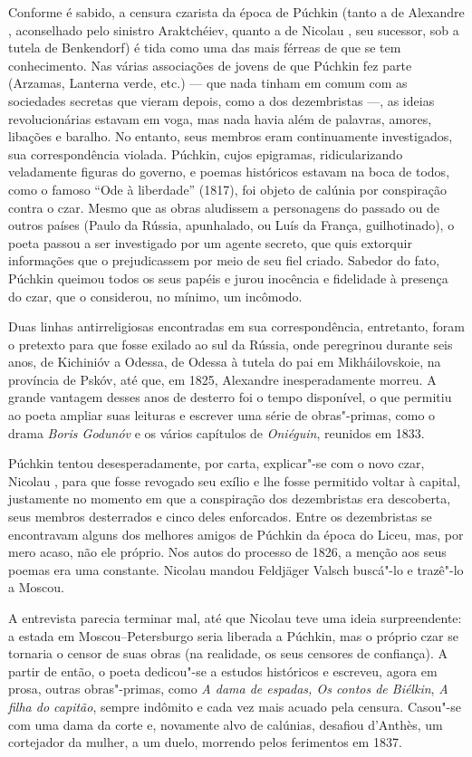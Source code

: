 Conforme é sabido, a censura czarista da época de Púchkin (tanto a de
Alexandre , aconselhado pelo sinistro Araktchéiev, quanto a de Nicolau , seu sucessor, sob a tutela de Benkendorf) é tida como uma das mais férreas de que se tem conhecimento. Nas várias associações de jovens de que Púchkin fez parte (Arzamas, Lanterna verde, etc.) --- que nada tinham em
comum com as sociedades secretas que vieram depois, como a dos dezembristas ---, as ideias revolucionárias estavam em voga, mas nada havia além de palavras, amores, libações e baralho. No entanto, seus membros eram continuamente investigados, sua correspondência violada. Púchkin, cujos epigramas, ridicularizando veladamente figuras do governo, e poemas históricos estavam na boca de todos, como o famoso ``Ode à liberdade'' (1817), foi objeto de calúnia por conspiração contra o czar. Mesmo que as obras aludissem a
personagens do passado ou de outros países (Paulo  da Rússia,
apunhalado, ou Luís  da França, guilhotinado), o poeta passou a ser investigado por um agente secreto, que quis extorquir informações que o
prejudicassem por meio de seu fiel criado. Sabedor do fato, Púchkin queimou todos os seus papéis e jurou inocência e fidelidade à presença do czar, que o considerou, no mínimo, um incômodo.

Duas linhas antirreligiosas encontradas em sua correspondência,
entretanto, foram o pretexto para que fosse exilado ao sul da Rússia,
onde peregrinou durante seis anos, de Kichinióv a
Odessa, de Odessa à tutela do pai em Mikháilovskoie, na província de
Pskóv, até que, em 1825, Alexandre  inesperadamente morreu. A grande
vantagem desses anos de desterro foi o tempo disponível, o que permitiu ao
poeta ampliar suas leituras e escrever uma série de obras"-primas, como o
drama \emph{Boris Godunóv} e os vários capítulos de
\emph{Oniéguin}, reunidos em 1833.

Púchkin tentou desesperadamente, por carta, explicar"-se com o novo czar,
Nicolau , para que fosse revogado seu exílio e lhe fosse permitido
voltar à capital, justamente no momento em que a conspiração dos dezembristas era descoberta, seus membros desterrados e cinco deles enforcados. Entre os dezembristas se encontravam alguns dos melhores amigos de Púchkin da época do Liceu, mas, por mero acaso, não ele próprio. Nos autos do processo de 1826, a
menção aos seus poemas era uma constante. Nicolau mandou Feldjäger Valsch buscá"-lo e trazê"-lo a Moscou.

A entrevista parecia terminar mal, até que Nicolau teve uma ideia
surpreendente: a estada em Moscou--Petersburgo seria liberada a Púchkin,
mas o próprio czar se tornaria o censor de suas obras (na realidade, os seus censores de confiança). A partir de então, o poeta dedicou"-se a
estudos históricos e escreveu, agora em prosa, outras obras"-primas,
como \emph{A dama de espadas, Os contos de Biélkin}, \emph{A filha do
capitão}, sempre indômito e cada vez mais acuado pela censura. Casou"-se com uma dama da corte e, novamente alvo de calúnias, desafiou d'Anthès, um cortejador da mulher, a um duelo, morrendo pelos ferimentos em 1837.



